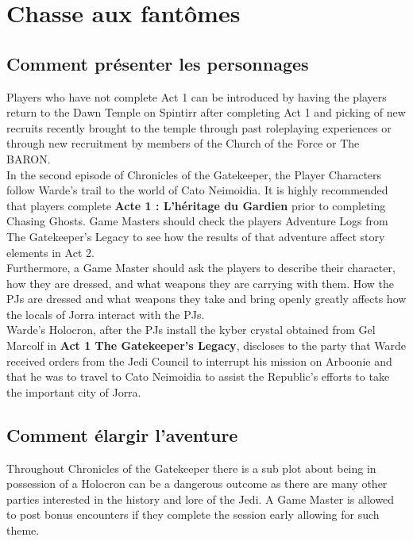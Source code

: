 \documentclass[twoside]{article}
\begin{document}
\section{Chasse aux fantômes}
\subsection{Comment présenter les personnages}
Players who have not complete Act 1 can be introduced by having the players return to the Dawn Temple on Spintirr after completing Act 1 and picking of new recruits recently brought to the temple through past roleplaying experiences or through new recruitment by members of the Church of the Force or The BARON.\\

In the second episode of Chronicles of the Gatekeeper, the Player Characters follow Warde's trail to the world of Cato Neimoidia.  It is highly recommended that players complete \textbf{Acte 1 : L'héritage du Gardien} prior to completing Chasing Ghosts.  Game Masters should check the players Adventure Logs from The Gatekeeper's Legacy to see how the results of that adventure affect story elements in Act 2.\\

Furthermore, a Game Master should ask the players to describe their character, how they are dressed, and what weapons they are carrying with them.  How the PJs are dressed and what weapons they take and bring openly greatly affects how the locals of Jorra interact with the PJs.\\

Warde's Holocron, after the PJs install the kyber crystal obtained from Gel Marcolf in \textbf{Act 1 The Gatekeeper's Legacy}, discloses to the party that Warde received orders from the Jedi Council to interrupt his mission on Arboonie and that he was to travel to Cato Neimoidia to assist the Republic's efforts to take the important city of Jorra.\\

\subsection{Comment élargir l'aventure}
Throughout Chronicles of the Gatekeeper there is a sub plot about being in possession of a Holocron can be a dangerous outcome as there are many other parties interested in the history and lore of the Jedi.  A Game Master is allowed to post bonus encounters if they complete the session early allowing for such theme.\\
\end{document}
